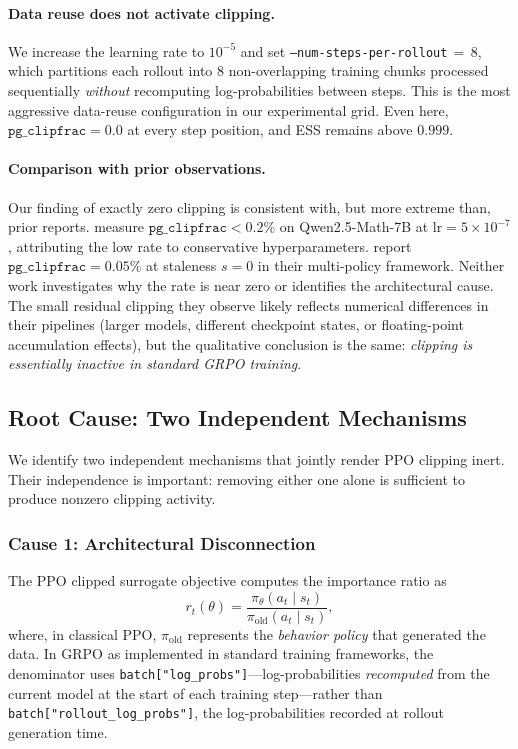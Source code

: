 \paragraph{Data reuse does not activate clipping.}
We increase the learning rate to $10^{-5}$ and set \texttt{--num-steps-per-rollout}$\,{=}\,8$, which partitions each rollout into 8 non-overlapping training chunks processed sequentially \emph{without} recomputing log-probabilities between steps.
This is the most aggressive data-reuse configuration in our experimental grid.
Even here, $\texttt{pg\_clipfrac} = 0.0$ at every step position, and ESS remains above $0.999$.

\paragraph{Comparison with prior observations.}
Our finding of exactly zero clipping is consistent with, but more extreme than, prior reports.
\citet{chen2025iclr} measure $\texttt{pg\_clipfrac} < 0.2\%$ on Qwen2.5-Math-7B at $\text{lr} = 5 \times 10^{-7}$, attributing the low rate to conservative hyperparameters.
\citet{prosperity2025} report $\texttt{pg\_clipfrac} = 0.05\%$ at staleness $s = 0$ in their multi-policy framework.
Neither work investigates why the rate is near zero or identifies the architectural cause.
The small residual clipping they observe likely reflects numerical differences in their pipelines (larger models, different checkpoint states, or floating-point accumulation effects), but the qualitative conclusion is the same: \emph{clipping is essentially inactive in standard GRPO training}.


\subsection{Root Cause: Two Independent Mechanisms}
\label{sec:root-cause}

We identify two independent mechanisms that jointly render PPO clipping inert.
Their independence is important: removing either one alone is sufficient to produce nonzero clipping activity.

\subsubsection{Cause 1: Architectural Disconnection}
\label{sec:cause-architectural}

The PPO clipped surrogate objective computes the importance ratio as
\begin{equation}
\label{eq:importance-ratio}
r_t(\theta) = \frac{\pi_\theta(a_t \mid s_t)}{\pi_{\text{old}}(a_t \mid s_t)},
\end{equation}
where, in classical PPO, $\pi_{\text{old}}$ represents the \emph{behavior policy} that generated the data.
In GRPO as implemented in standard training frameworks, the denominator uses \texttt{batch["log\_probs"]}---log-probabilities \emph{recomputed} from the current model at the start of each training step---rather than \texttt{batch["rollout\_log\_probs"]}, the log-probabilities recorded at rollout generation time.

